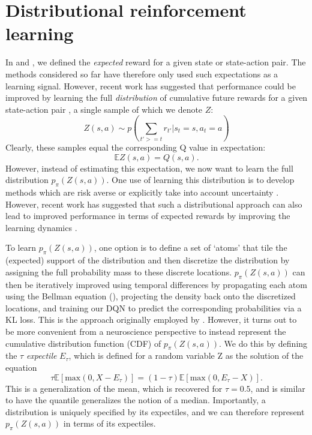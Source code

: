 \section*{Distributional reinforcement learning}
\label{sec:distributional}

In  and , we defined the \emph{expected} reward for a given state or state-action pair.
The methods considered so far have therefore only used such expectations as a learning signal.
However, recent work has suggested that performance could be improved by learning the full \emph{distribution} of cumulative future rewards for a given state-action pair \citep{bellemare2017distributional, bellemare2023distributional,dabney2018distributional}, a single sample of which we denote $Z$:
\begin{equation}
    Z(s, a) \sim p(\sum_{t' >= t} r_{t'} | s_t = s, a_t = a)
\end{equation}
Clearly, these samples equal the corresponding Q value in expectation:
\begin{equation}
    \mathbb{E} Z(s, a) = Q(s, a).
\end{equation}
However, instead of estimating this expectation, we now want to learn the full distribution $p_\pi(Z(s, a))$.
One use of learning this distribution is to develop methods which are risk averse \citep{morimura2010nonparametric,morimura2012parametric} or explicitly take into account uncertainty \citep{dearden1998bayesian}.
However, recent work has suggested that such a distributional approach can also lead to improved performance in terms of expected rewards by improving the learning dynamics \citep{bellemare2017distributional}.

To learn $p_\pi(Z(s, a))$, one option is to define a set of `atoms' that tile the (expected) support of the distribution and then discretize the distribution by assigning the full probability mass to these discrete locations.
$p_\pi(Z(s, a))$ can then be iteratively improved using temporal differences by propagating each atom using the Bellman equation (), projecting the density back onto the discretized locations, and training our DQN to predict the corresponding probabilities via a KL loss.
This is the approach originally employed by \citep{bellemare2017distributional}.
However, it turns out to be more convenient from a neuroscience perspective to instead represent the cumulative distribution function (CDF) of $p_\pi(Z(s, a))$.
We do this by defining the $\tau$ \emph{expectile} $E_\tau$, which is defined for a random variable Z as the solution of the equation
\begin{equation}
    \tau \mathbb{E} [\text{max}(0, X - E_\tau)] = (1-\tau) \mathbb{E} [\text{max}(0, E_\tau - X)].
\end{equation}
This is a generalization of the mean, which is recovered for $\tau = 0.5$, and is similar to have the quantile generalizes the notion of a median.
Importantly, a distribution is uniquely specified by its expectiles, and we can therefore represent $p_\pi(Z(s, a))$ in terms of its expectiles.

